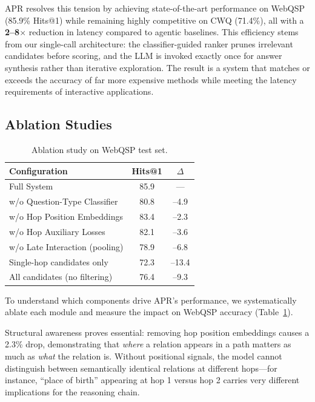 \documentclass[conference]{IEEEtran}
\newcommand{\model}{\textsc{APR}}
\begin{document}
\model{} resolves this tension by achieving state-of-the-art performance on WebQSP (85.9\% Hits@1) while remaining highly competitive on CWQ (71.4\%), all with a \textbf{2--8$\times$} reduction in latency compared to agentic baselines. This efficiency stems from our single-call architecture: the classifier-guided ranker prunes irrelevant candidates before scoring, and the LLM is invoked exactly once for answer synthesis rather than iterative exploration. The result is a system that matches or exceeds the accuracy of far more expensive methods while meeting the latency requirements of interactive applications.

\subsection{Ablation Studies}

\begin{table}[t]
\centering
\caption{Ablation study on WebQSP test set.}
\label{tab:ablation}
\begin{tabular}{lcc}
\toprule
Configuration & Hits@1 & $\Delta$ \\
\midrule
Full System & 85.9 & --- \\
\midrule
\quad w/o Question-Type Classifier & 80.8 & --4.9 \\
\quad w/o Hop Position Embeddings & 83.4 & --2.3 \\
\quad w/o Hop Auxiliary Losses & 82.1 & --3.6 \\
\quad w/o Late Interaction (pooling) & 78.9 & --6.8 \\
\midrule
Single-hop candidates only & 72.3 & --13.4 \\
All candidates (no filtering) & 76.4 & --9.3 \\
\bottomrule
\end{tabular}
\end{table}

To understand which components drive \model{}'s performance, we systematically ablate each module and measure the impact on WebQSP accuracy (Table~\ref{tab:ablation}).

Structural awareness proves essential: removing hop position embeddings causes a 2.3\% drop, demonstrating that \emph{where} a relation appears in a path matters as much as \emph{what} the relation is. Without positional signals, the model cannot distinguish between semantically identical relations at different hops---for instance, “place of birth” appearing at hop 1 versus hop 2 carries very different implications for the reasoning chain.
\end{document}
